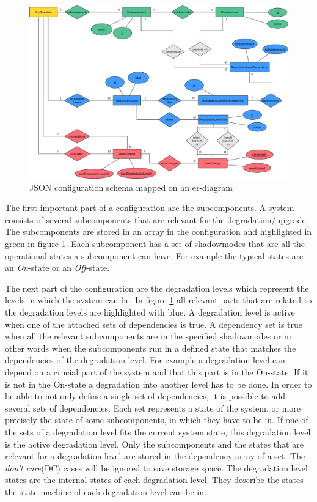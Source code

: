 \begin{figure}[ht]
    \centering
    \includegraphics[width=\textwidth]{img/configuration_diagramm.png}
    \caption{JSON configuration schema mapped on an er-diagram}
    \label{fig:configuration_diagram}
\end{figure}

\noindent The first important part of a configuration are the subcomponents. A system consists of several subcomponents that are relevant for the degradation/upgrade. The subcomponents are stored in an array in the configuration and highlighted in green in figure \ref{fig:configuration_diagram}. Each subcomponent has a set of shadowmodes that are all the operational states a subcomponent can have. For example the typical states are an \textit{On}-state or an \textit{Off}-state.

The next part of the configuration are the degradation levels which represent the levels in which the system can be. In figure \ref{fig:configuration_diagram} all relevant parts that are related to the degradation levels are highlighted with blue. A degradation level is active when one of the attached sets of dependencies is true. A dependency set is true when all the relevant subcomponents are in the specified shadowmodes or in other words when the subcomponents run in a defined state that matches the dependencies of the degradation level. For example a degradation level can depend on a crucial part of the system and that this part is in the On-state. If it is not in the On-state a degradation into another level has to be done. In order to be able to not only define a single set of dependencies, it is possible to add several sets of dependencies. Each set represents a state of the system, or more precisely the state of some subcomponents, in which they have to be in. If one of the sets of a degradation level fits the current system state, this degradation level is the active degradation level. Only the subcomponents and the states that are relevant for a degradation level are stored in the dependency array of a set. The \textit{don't care}(DC) cases will be ignored to save storage space. The degradation level states are the internal states of each degradation level. They describe the states the state machine of each degradation level can be in.

